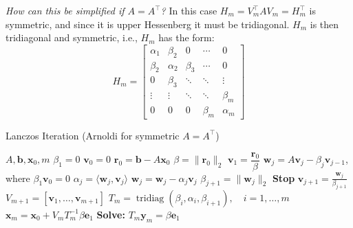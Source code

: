 \textit{How can this be simplified if $A = A^\top$?}
In this case $H_m = V_m^\top A V_m = H_m^\top$ is symmetric, and since it is upper Hessenberg it must be tridiagonal.
$H_m$ is then tridiagonal and symmetric, i.e., $H_m$ has the form:
\[
  H_m =
  \begin{bmatrix}
    \alpha_1 & \beta_2  & 0       & \cdots  & 0        \\
    \beta_2  & \alpha_2 & \beta_3 & \cdots  & 0        \\
    0        & \beta_3  & \ddots  & \ddots  & \vdots   \\
    \vdots   & \vdots   & \ddots  & \ddots  & \beta_m  \\
    0        & 0        & 0       & \beta_m & \alpha_m
  \end{bmatrix}
\]

\begin{algorithm}[htbp]
  \caption{Lanczos Iteration (Arnoldi for symmetric $A=A^\top$)}
  \label{alg:lanczos}
  \begin{algorithmic}[0]
    \Require $A, \mathbf{b}, \mathbf{x}_0, m$
    \State $\beta_1 = 0$
    \State $\mathbf{v}_0 = 0$
    \State $\mathbf{r}_0 = \mathbf{b} - A\mathbf{x}_0$
    \State $\beta = \|\mathbf{r}_0\|_2$
    \State $\mathbf{v}_1 = \dfrac{\mathbf{r}_0}{\beta}$
    \State $\mathbf{w}_j = A\mathbf{v}_j - \beta_j \mathbf{v}_{j-1}$, where $\beta_1 \mathbf{v}_0 = 0$
    \State $\alpha_j = \langle \mathbf{w}_j, \mathbf{v}_j \rangle$
    \State $\mathbf{w}_j = \mathbf{w}_j - \alpha_j \mathbf{v}_j$
    \State $\beta_{j+1} = \|\mathbf{w}_j\|_2$
     \textbf{Stop}
    \EndIf
    \State $\mathbf{v}_{j+1} = \frac{\mathbf{w}_j}{\beta_{j+1}}$
    \EndFor
    \Return $V_{m+1} = [\mathbf{v}_1, \ldots, \mathbf{v}_{m+1}]$
    \State $T_m = \operatorname{tridiag}(\beta_i, \alpha_i, \beta_{i+1}), \quad i=1,\ldots,m$
    \State $\mathbf{x}_m = \mathbf{x}_0 + V_m T_m^{-1} \beta \mathbf{e}_1$
    \State \textbf{Solve:} $T_m \mathbf{y}_m = \beta \mathbf{e}_1$
  \end{algorithmic}
\end{algorithm}


